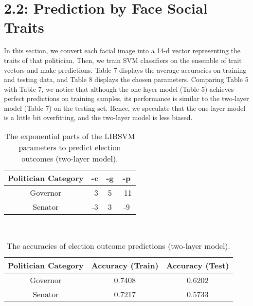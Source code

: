 \documentclass[10pt]{article}
\begin{document}
\section*{\small{2.2: Prediction by Face Social Traits}}
	In this section, we convert each facial image into a 14-d vector representing the traits of that politician. Then, we train SVM classifiers on the ensemble of trait vectors and make predictions. Table 7 displays the average accuracies on training and testing data, and Table 8 displays the chosen parameters. Comparing Table 5 with Table 7, we notice that although the one-layer model (Table 5) achieves perfect predictions on training samples, its performance is similar to the two-layer model (Table 7) on the testing set. Hence, we speculate that the one-layer model is a little bit overfitting, and the two-layer model is less biased.\\
	\begin{table}[ht]
 		\centering
 		\begin{tabular}{|c|c|c|c|}
		\hline
		\textbf{Politician Category} & \textbf{-c} & \textbf{-g} & \textbf{-p} \\ \hline
		Governor & -3 & 5 & -11 \\ \hline
		Senator & -3 & 3 & -9 \\ \hline
 		\end{tabular}
		\caption{The exponential parts of the LIBSVM parameters to predict election outcomes (two-layer model).}\label{tab7}
	\end{table}\\
	\begin{table}[ht]
 		\centering
 		\begin{tabular}{|c|c|c|}
		\hline
		\textbf{Politician Category} & \textbf{Accuracy (Train)} & \textbf{Accuracy (Test)} \\ \hline
		Governor & 0.7408 & 0.6202 \\ \hline
		Senator & 0.7217 & 0.5733 \\ \hline
 		\end{tabular}
		\caption{The accuracies of election outcome predictions (two-layer model).}\label{tab8}
	\end{table}\\
\end{document}
